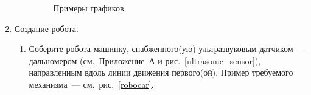 \documentclass[12pt,a4paper,openany]{extarticle}
\begin{document}
\begin{enumerate}
\begin{enumerate}
		\begin{figure}[h!]
			\caption{Примеры графиков.}
			\label{example}
		\end{figure}
	\end{enumerate}
	\item Создание робота.
	\begin{enumerate}
		\item Соберите робота-машинку, снабженного(ую) ультразвуковым датчиком~--- дальномером (см.~Приложение~А и рис.~\ref{ultrasonic_sensor}), направленным вдоль линии движения первого(ой).
		Пример требуемого механизма~--- см.~рис.~\ref{robocar}.
		\begin{figure}[h!]
			\begin{minipage}[h]{0.49\linewidth}
			\end{minipage}
			\hfill
			\begin{minipage}[h]{0.49\linewidth}

\end{minipage}
\end{figure}
\end{enumerate}
\end{enumerate}
\end{document}
